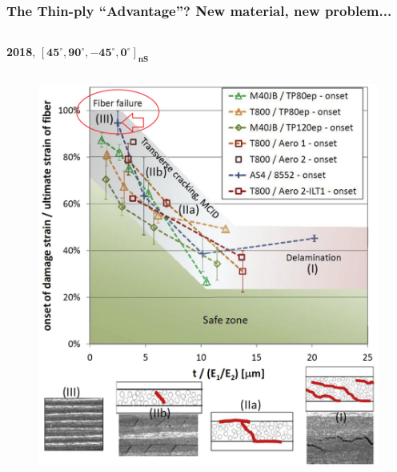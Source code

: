 \documentclass[first,firstsupp,lastsupp,last,hyperref,table]{ETHclass}
\begin{document}
\begin{frame}
\frametitle{\vspace{0.3cm}\small The Thin-ply ``Advantage''? New material, new problem...}
\vspace{-0.8cm}
\centering
\begin{columns}[t]
\begin{column}{0.5\textwidth}
\centering
\tiny
\textbf{2018}, $\mathbf{\left[45^{\circ}, 90^{\circ},-45^{\circ},0^{\circ}\right]_{nS}}$
\end{column}
\begin{column}{0.5\textwidth}
\centering

\end{column}
\end{columns}
\vspace{-0.4cm}
\begin{columns}[c]
\begin{column}{0.5\textwidth}
\begin{figure}
\centering
\includegraphics[width=0.9\columnwidth]{thinply-plythicknesseffect-brittle.png}
\end{figure}


\end{column}
\end{columns}
\end{frame}
\end{document}
